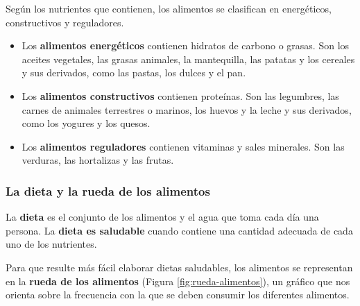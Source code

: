 Según los nutrientes que contienen, los alimentos se clasifican en energéticos, constructivos y reguladores.

\begin{itemize}
    \item Los \textbf{alimentos energéticos} contienen hidratos de carbono o grasas. Son los aceites vegetales, las grasas animales, la mantequilla, las patatas y los cereales y sus derivados, como las pastas, los dulces y el pan.
    \item Los \textbf{alimentos constructivos} contienen proteínas. Son las legumbres, las carnes de animales terrestres o marinos, los huevos y la leche y sus derivados, como los yogures y los quesos.
    \item Los \textbf{alimentos reguladores} contienen vitaminas y sales minerales. Son las verduras, las hortalizas y las frutas.
\end{itemize}

\subsubsection{La dieta y la rueda de los alimentos}

La \textbf{dieta} es el conjunto de los alimentos y el agua que toma cada día una persona. La \textbf{dieta es saludable} cuando contiene una cantidad adecuada de cada uno de los nutrientes.

\vspace{3mm}
Para que resulte más fácil elaborar dietas saludables, los alimentos se representan en la \textbf{rueda de los alimentos} (Figura \ref{fig:rueda-alimentos}), un gráfico que nos orienta sobre la frecuencia con la que se deben consumir los diferentes alimentos.

